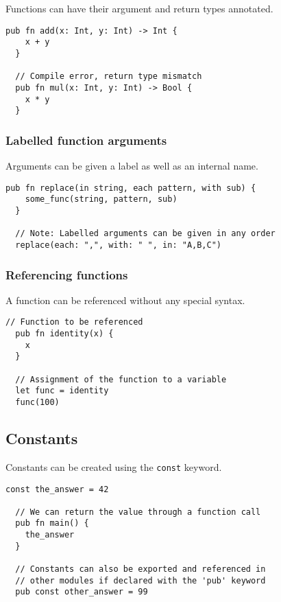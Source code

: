 Functions can have their argument and return types annotated.

\begin{lstlisting}[belowskip=-\baselineskip]
  pub fn add(x: Int, y: Int) -> Int {
    x + y
  }
  
  // Compile error, return type mismatch  
  pub fn mul(x: Int, y: Int) -> Bool {
    x * y
  }
\end{lstlisting}

\vs
\subsubsection*{\rmfamily Labelled function arguments}

Arguments can be given a label as well as an internal name.

\begin{lstlisting}[belowskip=-\baselineskip]
  pub fn replace(in string, each pattern, with sub) {
    some_func(string, pattern, sub)
  }

  // Note: Labelled arguments can be given in any order
  replace(each: ",", with: " ", in: "A,B,C")
\end{lstlisting}

\vs
\subsubsection*{\rmfamily Referencing functions}

A function can be referenced without any special syntax.

\begin{lstlisting}[belowskip=-\baselineskip]
  // Function to be referenced
  pub fn identity(x) {
    x
  }
  
  // Assignment of the function to a variable
  let func = identity
  func(100)
\end{lstlisting}

\vs
\subsection*{\rmfamily Constants}

Constants can be created using the 
\lstinline[language=Gleam, basicstyle=\small]!const! keyword.

\begin{lstlisting}[belowskip=-\baselineskip]
  const the_answer = 42

  // We can return the value through a function call
  pub fn main() {
    the_answer
  }

  // Constants can also be exported and referenced in 
  // other modules if declared with the 'pub' keyword 
  pub const other_answer = 99
\end{lstlisting}

